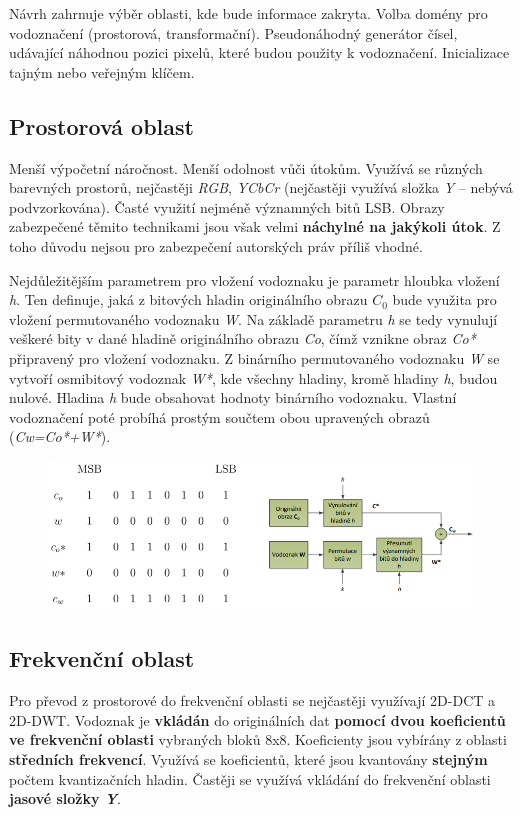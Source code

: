 Návrh zahrnuje výběr oblasti, kde bude informace zakryta. Volba domény pro vodoznačení (prostorová, transformační). Pseudonáhodný generátor čísel, udávající náhodnou pozici pixelů, které budou použity k vodoznačení. Inicializace tajným nebo veřejným klíčem.


\subsection{Prostorová oblast}

Menší výpočetní náročnost. Menší odolnost vůči útokům. Využívá se různých barevných prostorů, nejčastěji \textit{RGB}, \textit{YCbCr} (nejčastěji využívá složka \textit{Y} -- nebývá podvzorkována). Časté využití nejméně významných bitů LSB. Obrazy zabezpečené těmito technikami jsou však velmi \textbf{náchylné na jakýkoli útok}. Z toho důvodu nejsou pro zabezpečení autorských práv příliš vhodné.

Nejdůležitějším parametrem pro vložení vodoznaku je parametr hloubka
vložení \textit{h}. Ten definuje, jaká z bitových hladin originálního obrazu $C_{0}$ bude využita pro vložení permutovaného vodoznaku \textit{W}. Na základě parametru \textit{h} se tedy vynulují veškeré bity v dané hladině originálního obrazu \textit{Co}, čímž vznikne obraz \textit{Co*} připravený pro vložení vodoznaku. Z binárního permutovaného vodoznaku \textit{W} se vytvoří osmibitový vodoznak \textit{W*}, kde všechny hladiny, kromě hladiny \textit{h}, budou nulové. Hladina \textit{h} bude obsahovat hodnoty binárního vodoznaku. Vlastní vodoznačení poté probíhá prostým součtem obou upravených obrazů (\textit{Cw=Co*+W*}).

\begin{figure}[ht]
    \centering
    \includegraphics[width=0.75\linewidth]{MPC-ZMD//images/fr.png}
\end{figure}
\FloatBarrier

\subsection{Frekvenční oblast}

Pro převod z prostorové do frekvenční oblasti se nejčastěji využívají 2D-DCT a 2D-DWT. Vodoznak je \textbf{vkládán} do originálních dat \textbf{pomocí dvou koeficientů ve frekvenční oblasti} vybraných bloků 8x8. Koeficienty jsou vybírány z oblasti \textbf{středních frekvencí}. Využívá se koeficientů, které jsou kvantovány \textbf{stejným} počtem kvantizačních hladin. Častěji se využívá vkládání do frekvenční oblasti \textbf{jasové složky \textit{Y}}.


